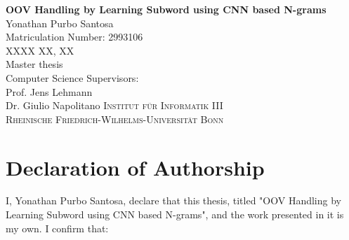 \documentclass[a4paper,12pt]{report}
\begin{document}




\thispagestyle{empty}
\vskip40mm
\begin{center}
\huge\textbf{OOV Handling by Learning Subword using CNN based N-grams}\\
\vskip 1.5cm
\large Yonathan Purbo Santosa\\
Matriculation Number: 2993106\\
XXXX XX, XX\\
\vskip 1.5cm
Master thesis\\
Computer Science
\vskip 1.5cm
Supervisors:\\
Prof. Jens Lehmann\\
Dr. Giulio Napolitano
\vfill
\textsc{Institut f{\"u}r Informatik III}\\
\textsc{Rheinische Friedrich-Wilhelms-Universit{\"a}t Bonn}
\end{center}

\newpage
\thispagestyle{empty}
\mbox{}

\chapter*{Declaration of Authorship}
I, Yonathan Purbo Santosa, declare that this thesis, titled "OOV Handling by
Learning Subword using CNN based N-grams", and the work presented in
it is my own. I confirm that:
\end{document}
